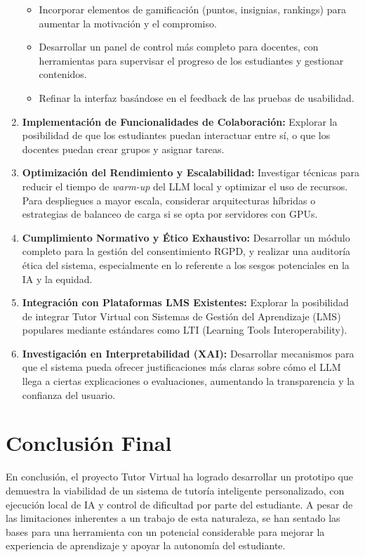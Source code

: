 \begin{enumerate}[label=\arabic*., leftmargin=*]
        \begin{itemize}
            \item Incorporar elementos de gamificación (puntos, insignias, rankings) para aumentar la motivación y el compromiso.
            \item Desarrollar un panel de control más completo para docentes, con herramientas para supervisar el progreso de los estudiantes y gestionar contenidos.
            \item Refinar la interfaz basándose en el feedback de las pruebas de usabilidad.
        \end{itemize}
    \item \textbf{Implementación de Funcionalidades de Colaboración:} Explorar la posibilidad de que los estudiantes puedan interactuar entre sí, o que los docentes puedan crear grupos y asignar tareas.
    \item \textbf{Optimización del Rendimiento y Escalabilidad:} Investigar técnicas para reducir el tiempo de \emph{warm-up} del LLM local y optimizar el uso de recursos. Para despliegues a mayor escala, considerar arquitecturas híbridas o estrategias de balanceo de carga si se opta por servidores con GPUs.
    \item \textbf{Cumplimiento Normativo y Ético Exhaustivo:} Desarrollar un módulo completo para la gestión del consentimiento RGPD, y realizar una auditoría ética del sistema, especialmente en lo referente a los sesgos potenciales en la IA y la equidad.
    \item \textbf{Integración con Plataformas LMS Existentes:} Explorar la posibilidad de integrar Tutor Virtual con Sistemas de Gestión del Aprendizaje (LMS) populares mediante estándares como LTI (Learning Tools Interoperability).
    \item \textbf{Investigación en Interpretabilidad (XAI):} Desarrollar mecanismos para que el sistema pueda ofrecer justificaciones más claras sobre cómo el LLM llega a ciertas explicaciones o evaluaciones, aumentando la transparencia y la confianza del usuario.
\end{enumerate}

\section{Conclusión Final}
\label{sec:conclusiones_final}

En conclusión, el proyecto Tutor Virtual ha logrado desarrollar un prototipo que demuestra la viabilidad de un sistema de tutoría inteligente personalizado, con ejecución local de IA y control de dificultad por parte del estudiante. A pesar de las limitaciones inherentes a un trabajo de esta naturaleza, se han sentado las bases para una herramienta con un potencial considerable para mejorar la experiencia de aprendizaje y apoyar la autonomía del estudiante.

